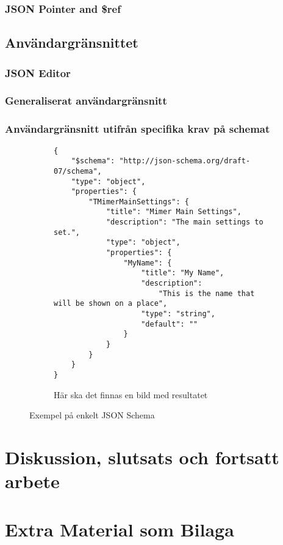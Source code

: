 \documentclass[swedish]{kththesis}
\begin{document}
\subsection{JSON Pointer and \$ref}

\section{Användargränsnittet}

\subsection{JSON Editor}

\subsection{Generaliserat användargränsnitt}

\subsection{Användargränsnitt utifrån specifika krav på schemat}
\begin{figure}
	\begin{subfigure}{\textwidth}
		\centering
		\begin{verbatim}
{
	"$schema": "http://json-schema.org/draft-07/schema",
	"type": "object",
	"properties": {
		"TMimerMainSettings": {
			"title": "Mimer Main Settings",
			"description": "The main settings to set.",
			"type": "object",
			"properties": {
				"MyName": {
					"title": "My Name",
					"description":
						"This is the name that will be shown on a place",
					"type": "string",
					"default": ""
				}
			}
		}
	}
}
		\end{verbatim}
		\vspace{2em}
	\end{subfigure}
	\begin{subfigure}{\textwidth}
		\centering
		Här ska det finnas en bild med resultatet
	\end{subfigure}
	\caption{Exempel på enkelt JSON Schema}
\end{figure}

\chapter{Diskussion, slutsats och fortsatt arbete}

\printbibliography[heading=bibintoc] %

\appendix

\chapter{Extra Material som Bilaga}
\end{document}
